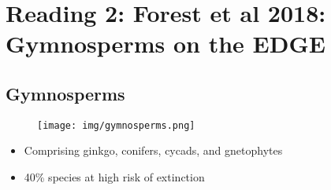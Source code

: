 \section{Reading 2: Forest et al 2018: Gymnosperms on the EDGE}

\subsection{Gymnosperms}

\begin{figure}[H]
    \centering
    \texttt{[image: img/gymnosperms.png]}
\end{figure}

\begin{itemize}
    \item Comprising ginkgo, conifers, cycads, and gnetophytes
    \item 40\% species at high risk of extinction
\end{itemize}